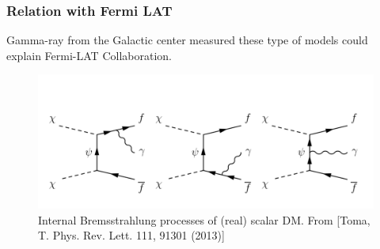 \documentclass{beamer}
\begin{document}

\begin{frame}
\frametitle{Relation with Fermi LAT}

Gamma-ray from the Galactic center measured these type of models could explain Fermi-LAT Collaboration.

\begin{figure}
\centering
\includegraphics[scale=0.3]{pictures/Bremsstrahlung} 
\caption{Internal Bremsstrahlung processes of (real) scalar DM. From [Toma, T. Phys. Rev. Lett. 111, 91301 (2013)] }
\label{fig:Brem}
\end{figure}

\end{frame}
\end{document}

